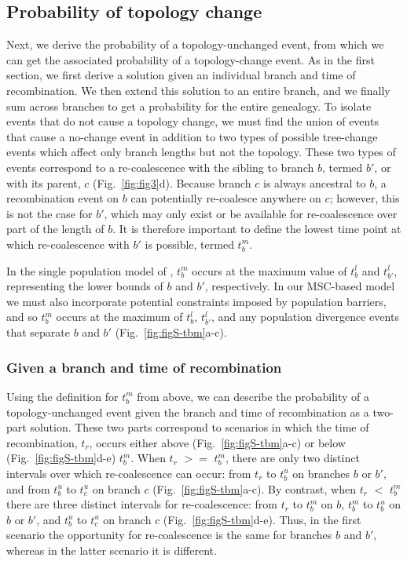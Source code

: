 \documentclass[11pt]{article}
\begin{document}
\subsection{Probability of topology change}
Next, we derive the probability of a topology-unchanged event, from which
we can get the associated probability of a topology-change event. 
As in the first section, we first derive a solution given an individual 
branch and time of recombination. We then extend this solution to an entire branch, and we 
finally sum across branches to get a probability for the entire genealogy. 
To isolate events that do not cause a topology change, we must find
the union of events that cause a no-change event in addition to two types of 
possible tree-change events which affect only branch lengths but not the 
topology. These two types of events correspond to a re-coalescence with the 
sibling to branch $b$, termed $b'$, or with its parent, $c$ (Fig.~\ref{fig:fig3}d).
Because branch $c$ is always ancestral to $b$, a recombination
event on $b$ can potentially re-coalesce anywhere on $c$; however, 
this is not the case for $b'$, which may only exist or be available for 
re-coalescence over part of the length of $b$. It is therefore important 
to define the lowest time point at which re-coalescence with $b'$ is 
possible, termed $t_b^m$. 

In the single population model of \citet{deng_distribution_2021}, 
$t_b^m$ occurs at the maximum value of $t_b^l$ and $t_{b'}^l$, 
representing the lower bounds of $b$ and $b'$, respectively. 
In our MSC-based model we must also incorporate potential 
constraints imposed by population barriers, and so $t_b^m$ occurs at 
the maximum of $t_b^l$, $t_{b'}^l$, and any population divergence 
events that separate $b$ and $b'$ (Fig.~\ref{fig:figS-tbm}a-c).


\subsubsection{Given a branch and time of recombination}
Using the definition for $t_b^m$ from above, we can describe the probability
of a topology-unchanged event given the branch and time of recombination
as a two-part solution. These two parts correspond to scenarios in which
the time of recombination, $t_r$, occurs either above (Fig.~\ref{fig:figS-tbm}a-c)
or below (Fig.~\ref{fig:figS-tbm}d-e) $t_b^m$. When $t_r$ $>=$ $t_b^m$, there
are only two distinct intervals over which re-coalescence can occur: from
$t_r$ to $t_b^u$ on branches $b$ or $b'$, and from $t_b^u$ to $t_c^u$ on 
branch $c$ (Fig.~\ref{fig:figS-tbm}a-c). By contrast, when $t_r$ $<$ $t_b^m$
there are three distinct intervals for re-coalescence: from $t_r$ to $t_b^m$
on $b$, $t_b^m$ to $t_b^u$ on $b$ or $b'$, and $t_b^u$ to $t_c^u$ on 
branch $c$ (Fig.~\ref{fig:figS-tbm}d-e). Thus, in the first scenario 
the opportunity for re-coalescence is the same for branches $b$ 
and $b'$, whereas in the latter scenario it is different.
\end{document}
